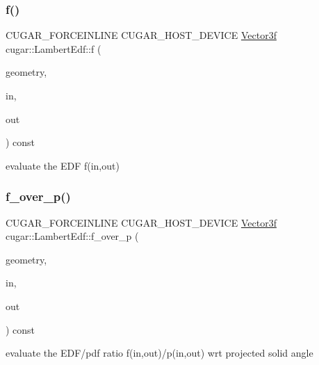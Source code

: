 \subsubsection{\texorpdfstring{f()}{f()}}
{\footnotesize\ttfamily C\+U\+G\+A\+R\+\_\+\+F\+O\+R\+C\+E\+I\+N\+L\+I\+NE C\+U\+G\+A\+R\+\_\+\+H\+O\+S\+T\+\_\+\+D\+E\+V\+I\+CE \hyperlink{structcugar_1_1_vector}{Vector3f} cugar\+::\+Lambert\+Edf\+::f (\begin{DoxyParamCaption}\item[{const \hyperlink{structcugar_1_1_differential_geometry}{Differential\+Geometry} \&}]{geometry,  }\item[{const \hyperlink{structcugar_1_1_vector}{Vector3f}}]{in,  }\item[{const \hyperlink{structcugar_1_1_vector}{Vector3f}}]{out }\end{DoxyParamCaption}) const\hspace{0.3cm}{\ttfamily [inline]}}

evaluate the E\+DF f(in,out) \mbox{\label{structcugar_1_1_lambert_edf_a22dec6f632492c998702dc6f1f4c62c0}} 
\subsubsection{\texorpdfstring{f\+\_\+over\+\_\+p()}{f\_over\_p()}}
{\footnotesize\ttfamily C\+U\+G\+A\+R\+\_\+\+F\+O\+R\+C\+E\+I\+N\+L\+I\+NE C\+U\+G\+A\+R\+\_\+\+H\+O\+S\+T\+\_\+\+D\+E\+V\+I\+CE \hyperlink{structcugar_1_1_vector}{Vector3f} cugar\+::\+Lambert\+Edf\+::f\+\_\+over\+\_\+p (\begin{DoxyParamCaption}\item[{const \hyperlink{structcugar_1_1_differential_geometry}{Differential\+Geometry} \&}]{geometry,  }\item[{const \hyperlink{structcugar_1_1_vector}{Vector3f}}]{in,  }\item[{const \hyperlink{structcugar_1_1_vector}{Vector3f}}]{out }\end{DoxyParamCaption}) const\hspace{0.3cm}{\ttfamily [inline]}}

evaluate the E\+D\+F/pdf ratio f(in,out)/p(in,out) wrt projected solid angle \mbox{\label{structcugar_1_1_lambert_edf_acc3121156681c4433b1e85ae2de74605}} 
